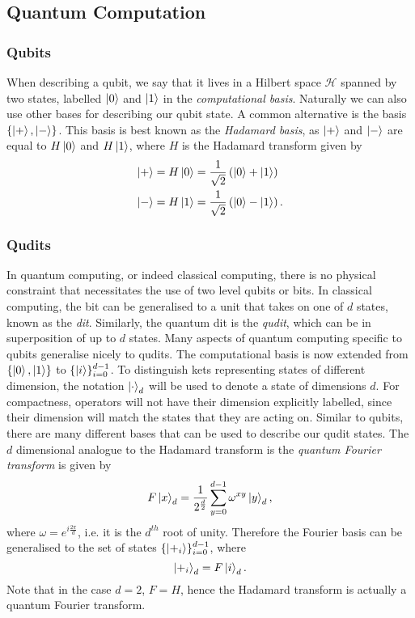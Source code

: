 \subsection{Quantum Computation}
\subsubsection{Qubits}
\label{subsubsection:qubits}
When describing a qubit, we say that it lives in a Hilbert space $\mathcal{H}$ spanned by two states, labelled $\ket{0}$ and $\ket{1}$ in the \emph{computational basis}. Naturally we can also use other bases for describing our qubit state. A common alternative is the basis $\{\ket{+}, \ket{-}\}$.
This basis is best known as the \emph{Hadamard basis}, as $\ket{+}$ and $\ket{-}$ are equal to $H\ket{0}$ and $H\ket{1}$, where $H$ is the Hadamard transform given by
\begin{align}
    \ket{+} &= H\ket{0} = \frac{1}{\sqrt2} \left(\ket{0} + \ket{1}\right)\\
    \ket{-} &= H\ket{1} = \frac{1}{\sqrt2} \left(\ket{0} - \ket{1}\right).
\end{align}

\subsubsection{Qudits}
\label{subsubsection:qudits}
In quantum computing, or indeed classical computing, there is no physical constraint that necessitates the use of two level qubits or bits.
In classical computing, the bit can be generalised to a unit that takes on one of $d$ states, known as the \emph{dit}.
Similarly, the quantum dit is the \emph{qudit}, which can be in superposition of up to $d$ states.
Many aspects of quantum computing specific to qubits generalise nicely to qudits.
The computational basis is now extended from $\{\ket{0}, \ket{1}\}$ to $\{\ket{i}\}_{i=0}^{d-1}$.
To distinguish kets representing states of different dimension, the notation $\ket{\cdot}_d$ will be used to denote a state of dimensions $d$.
For compactness, operators will not have their dimension explicitly labelled, since their dimension will match the states that they are acting on.
Similar to qubits, there are many different bases that can be used to describe our qudit states.
The $d$ dimensional analogue to the Hadamard transform is the \emph{quantum Fourier transform} is given by
\begin{equation}
    F\ket{x}_d = \frac{1}{2^{\frac{d}{2}}} \sum_{y=0}^{d-1} \omega^{xy}\ket{y}_d,
\end{equation}
where $\omega = e^{i\frac{2\pi}{d}}$, i.e. it is the $d^{th}$ root of unity.
Therefore the Fourier basis can be generalised to the set of states  $\{\ket{+_i}\}_{i=0}^{d-1}$, where
\begin{equation}
    \ket{+_i}_d = F\ket{i}_d.
\end{equation}
Note that in the case $d=2$, $F = H$, hence the Hadamard transform is actually a quantum Fourier transform.\newline

